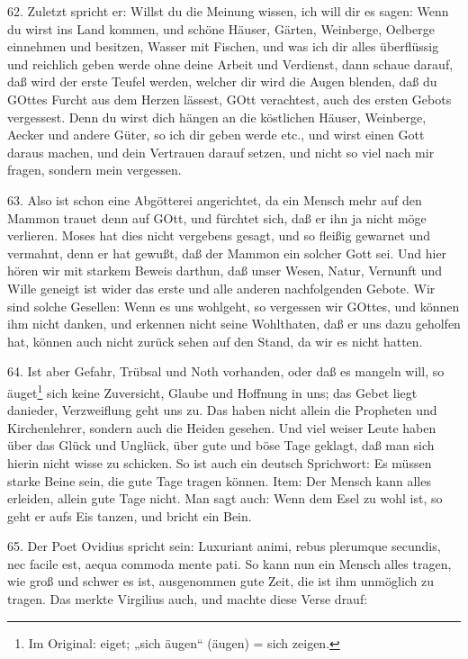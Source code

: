 62. Zuletzt spricht er: Willst du die Meinung wissen, ich will dir es sagen: Wenn du wirst ins Land kommen, und schöne Häuser, Gärten, Weinberge, Oelberge einnehmen und besitzen, Wasser mit Fischen, und was ich dir alles überflüssig und reichlich geben werde ohne deine Arbeit und Verdienst, dann schaue darauf, daß wird der erste Teufel werden, welcher dir wird die Augen blenden, daß du GOttes Furcht aus dem Herzen lässest, GOtt verachtest, auch des ersten Gebots vergessest. Denn du wirst dich hängen an die köstlichen Häuser, Weinberge, Aecker und andere Güter, so ich dir geben werde etc., und wirst einen Gott daraus machen, und dein Vertrauen darauf setzen, und nicht so viel nach mir fragen, sondern mein vergessen.

63. Also ist schon eine Abgötterei angerichtet, da ein Mensch mehr auf den Mammon trauet denn auf GOtt, und fürchtet sich, daß er ihn ja nicht möge verlieren. Moses hat dies nicht vergebens gesagt, und so fleißig gewarnet und vermahnt, denn er hat gewußt, daß der Mammon ein solcher Gott sei. Und hier hören wir mit starkem Beweis darthun, daß unser Wesen, Natur, Vernunft und Wille geneigt ist wider das erste und alle anderen nachfolgenden Gebote. Wir sind solche Gesellen: Wenn es uns wohlgeht, so vergessen wir GOttes, und können ihm nicht danken, und erkennen nicht seine Wohlthaten, daß er uns dazu geholfen hat, können auch nicht zurück sehen auf den Stand, da wir es nicht hatten.

64. Ist aber Gefahr, Trübsal und Noth vorhanden, oder daß es mangeln will, so äuget\footnote{Im Original: eiget; „sich äugen“ (äugen) = sich zeigen.} sich keine Zuversicht, Glaube und Hoffnung in uns; das Gebet liegt danieder, Verzweiflung geht uns zu. Das haben nicht allein die Propheten und Kirchenlehrer, sondern auch die Heiden gesehen. Und viel weiser Leute haben über das Glück und Unglück, über gute und böse Tage geklagt, daß man sich hierin nicht wisse zu schicken. So ist auch ein deutsch Sprichwort: Es müssen starke Beine sein, die gute Tage tragen können. Item: Der Mensch kann alles erleiden, allein gute Tage nicht. Man sagt auch: Wenn dem Esel zu wohl ist, so geht er aufs Eis tanzen, und bricht ein Bein.

65. Der Poet Ovidius spricht sein: Luxuriant animi, rebus plerumque secundis, nec facile est, aequa commoda mente pati. So
kann nun ein Mensch alles tragen, wie groß und schwer es ist, ausgenommen gute Zeit, die ist ihm unmöglich zu tragen. Das merkte Virgilius auch, und machte diese Verse drauf:

